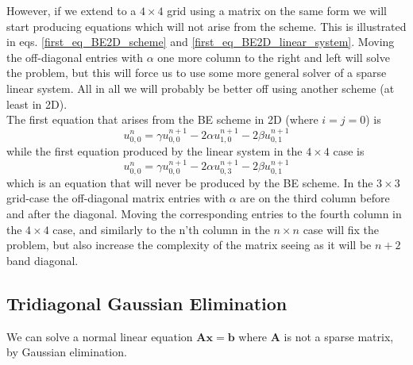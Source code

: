 However, if we extend to a $4\times4$ grid using a matrix on the same form we will start producing equations which will not arise from the scheme. 
This is illustrated in eqs. \ref{first_eq_BE2D_scheme} and \ref{first_eq_BE2D_linear_system}. 
Moving the off-diagonal entries with $\alpha$ one more column to the right and left will solve the problem, but this will force us to use some more general solver of a sparse linear system. 
All in all we will probably be better off using another scheme (at least in 2D).\\
The first equation that arises from the BE scheme in 2D (where $i=j=0$) is
\begin{equation}\label{first_eq_BE2D_scheme}
 u^n_{0,0} = \gamma u^{n+1}_{0,0}-2\alpha u^{n+1}_{1,0} -2\beta u^{n+1}_{0,1}
\end{equation}
while the first equation produced by the linear system in the $4\times4$ case is 
\begin{equation}\label{first_eq_BE2D_linear_system}
 u^n_{0,0} = \gamma u^{n+1}_{0,0}-2\alpha u^{n+1}_{0,3} -2\beta u^{n+1}_{0,1}
\end{equation}
which is an equation that will never be produced by the BE scheme. 
In the $3\times3$ grid-case the off-diagonal matrix entries with $\alpha$ are on the third column before and after the diagonal. 
Moving the corresponding entries to the fourth column in the $4\times4$ case, and similarly to the n'th column in the $n\times n$ case will fix the problem, but also increase the complexity of the matrix seeing as it will be $n+2$ band diagonal.

\subsection{Tridiagonal Gaussian Elimination}

We can solve a normal linear equation $\mathbf{A}\mathbf{x} = \mathbf{b}$ where $\mathbf{A}$ is not a sparse matrix, by Gaussian elimination.


